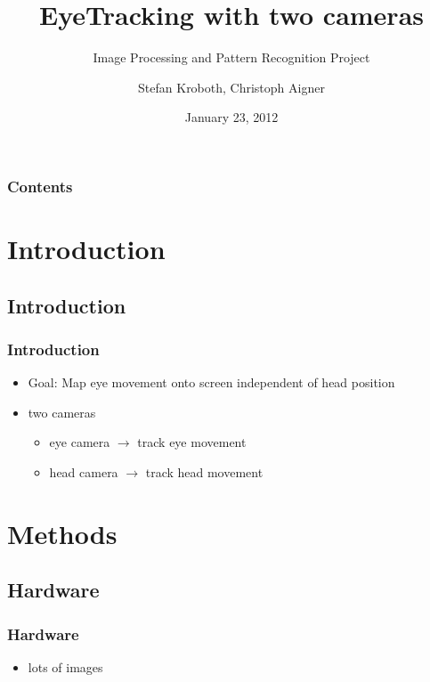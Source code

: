 \documentclass[%
14pt
]{beamer}
\title{EyeTracking with two cameras}
\subtitle{Image Processing and Pattern Recognition Project}
\author{Stefan Kroboth, Christoph Aigner}
\date{January 23, 2012}		%
\begin{document}

\begin{frame}[plain]
  \frametitle{}
  \titlepage %
\end{frame}



\begin{frame}
  \frametitle{Contents}
  \begin{spacing}{0.7}
        \tableofcontents[hideallsubsections %
                        ] %
                      \end{spacing}
\end{frame}

\section{Introduction}
\subsection{Introduction}
\begin{frame}
	\frametitle{Introduction}
  \begin{itemize}
    \item Goal: Map eye movement onto screen independent of head position
    \item two cameras
      \begin{itemize}
        \item eye camera $\rightarrow$ track eye movement
        \item head camera $\rightarrow$ track head movement
      \end{itemize}
  \end{itemize}
\end{frame}

\section{Methods}
\subsection{Hardware}
\begin{frame}
	\frametitle{Hardware}
  \begin{itemize}
    \item lots of images
  \end{itemize}
\end{frame}
\end{document}
